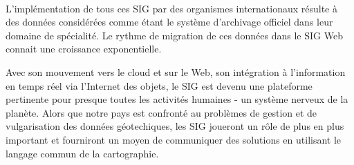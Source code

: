 
\paragraph{}
L’implémentation de tous ces SIG par des organismes internationaux résulte à des données considérées 
comme étant le système d’archivage officiel dans leur domaine de spécialité.
Le rythme de migration de ces données dans le SIG Web connait une croissance exponentielle. 
\par
Avec son mouvement vers le cloud et sur le Web, son intégration à l'information 
en temps réel via l'Internet des objets, le SIG est devenu une plateforme 
pertinente pour presque toutes les activités humaines - un système nerveux de 
la planète. Alors que notre pays est confronté au problèmes de gestion et de vulgarisation 
des données géotechiques, les SIG joueront un rôle de plus 
en plus important et 
fourniront un moyen de communiquer des solutions en utilisant le langage commun de 
la cartographie.